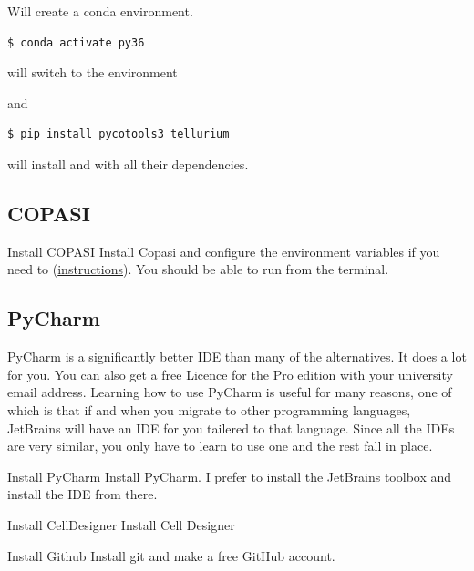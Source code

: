 \documentclass[../main]{subfiles}
\begin{document}
Will create a conda environment.

\begin{verbatim}
$ conda activate py36
\end{verbatim}

will switch to the environment

and

\begin{verbatim}
$ pip install pycotools3 tellurium
\end{verbatim}

will install  and  with all their dependencies.


\subsection{COPASI}

\begin{Task}{Install COPASI}
Install Copasi and configure the environment variables if you need to
(\href{https://pycotools3.readthedocs.io/en/latest/#troubleshooting}{instructions}). You should be able to
run  from the terminal.
\end{Task}

\subsection{PyCharm}
PyCharm is a significantly better IDE than many of the alternatives. It does a lot for you. You can also
get a free Licence for the Pro edition with your university email address. Learning how to use
PyCharm is useful for many reasons, one of which is that if and when you migrate to other programming
languages, JetBrains will have an IDE for you tailered to that language. Since all the IDEs are
very similar, you only have to learn to use one and the rest fall in place.

\begin{Task}{Install PyCharm}
Install PyCharm. I prefer to install the JetBrains toolbox and install the IDE from there.
\end{Task}
\begin{Task}{Install CellDesigner}
Install Cell Designer
\end{Task}
\begin{Task}{Install Github}
Install git and make a free GitHub account.
\end{Task}
\end{document}
